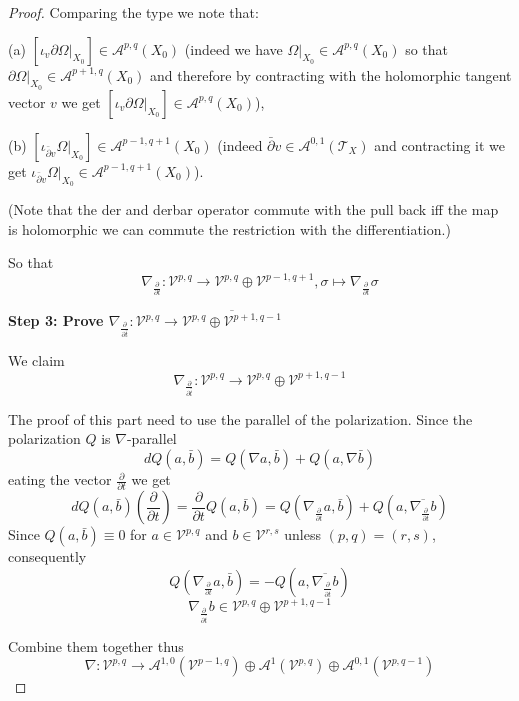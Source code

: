 \documentclass[11pt]{article}
\theoremstyle{definition}
\begin{document}
\begin{proof}
	
	Comparing the type we note that:
	
	(a) $[\iota_v  \partial \Omega|_{X_0}] \in \mathcal{A}^{p,q}(X_0)$ (indeed we have $\Omega |_{X_0}\in \mathcal{A}^{p,q}(X_0)$ so that $\partial \Omega|_{X_0} \in \mathcal{A}^{p+1,q}(X_0)$ and therefore by contracting with the holomorphic tangent vector $v$ we get $[\iota_v \partial \Omega|_{X_0}] \in \mathcal{A}^{p,q}(X_0)$),
	
	(b) $[\iota_{\bar{\partial} v} \Omega|_{X_0}]\in \mathcal{A}^{p-1,q+1}(X_0)$ (indeed $\bar{\partial} v \in \mathcal{A}^{0,1}(\mathcal{T}_X)$ and contracting it we get $\iota_{\bar{\partial} v}\Omega|_{X_0} \in \mathcal{A}^{p-1,q+1}(X_0)$). 
	
	(Note that the der and derbar operator commute with the pull back iff the map is holomorphic we can commute the restriction with the differentiation.)
	
	So that $$\nabla _{\frac{\partial }{\partial  t}}: \mathcal{V}^{p,q}\to \mathcal{V}^{p,q}\oplus \mathcal{V}^{p-1,q+1}, \sigma  \mapsto  \nabla_{\frac{\partial }{\partial t}} \sigma$$
	
	
	\textbf{Step 3: Prove $\nabla_{\frac{\partial }{{\partial} \bar{t}}}:\mathcal{V}^{p,q}\to \overline{\mathcal{V}^{p,q}\oplus \mathcal{V}^{p+1,q-1}}$}
	
	We claim
	$$\nabla_{\frac{\partial }{{\partial} \bar{t}}}:\mathcal{V}^{p,q}\to {\mathcal{V}^{p,q}\oplus \mathcal{V}^{p+1,q-1}}$$
	
	The proof of this part need to use the parallel of the polarization. Since the polarization $Q$ is $\nabla$-parallel $$dQ(a,\bar{b}) =  Q(\nabla  a ,\bar{b}) + Q(a,\nabla \bar{b})$$
	eating the vector $\frac{\partial }{\partial t}$ we get $$ dQ(a,\bar{b}) (\frac{\partial }{\partial t}) = \frac{\partial }{\partial t} Q(a,\bar{b})  =  Q(\nabla_{\frac{\partial }{\partial t}} a  ,\bar{b}) + Q(a,\overline{ \nabla_{\frac{\partial }{\partial t}} b})  $$
	Since $Q(a,\bar{b}) \equiv 0$ for $a \in \mathcal{V}^{p,q}$ and $b \in \mathcal{V}^{r,s}$ unless $(p,q) = (r,s)$, consequently $$ Q\left(\nabla _{\frac{\partial }{\partial t }}a,\bar{b}\right) =  -Q(a, \overline{\nabla _{\frac{\partial }{\partial \bar{t}}}b})$$
	$$\nabla_{\frac{\partial }{\partial \overline{t}}}b \in \mathcal{V}^{p,q}\oplus { \mathcal{V}^{p+1,q-1}}$$
	
	Combine them together thus
	$$\nabla : \mathcal{V}^{p,q}\to \mathcal{A}^{1,0}(\mathcal{V}^{p-1,q})\oplus \mathcal{A}^{1}(\mathcal{V}^{p,q})\oplus \mathcal{A}^{0,1}(\mathcal{V}^{p,q-1})$$
	
	\end{proof}
\end{document}
